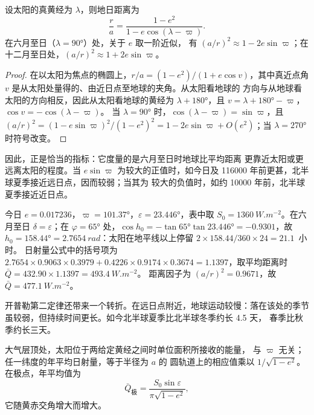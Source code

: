 \begin{proposition}[地日距离与太阳黄经]\label{prop:b2:orbital-forcing:distance}
设太阳的真黄经为 $\lambda$，则地日距离为
\[
  \frac{r}{a} = \frac{1 - e^2}{1 - e\cos(\lambda - \varpi)} .
\]
在六月至日（$\lambda = \ang{90}$）处，关于 $e$ 取一阶近似，
有 $(a/r)^2 \approx 1 - 2e\sin\varpi$；在十二月至日处，$(a/r)^2 \approx 1 + 2e\sin\varpi$。
\end{proposition}

\begin{proof}
在以太阳为焦点的椭圆上，$r/a = (1 - e^2)/(1 + e\cos v)$，其中真近点角 $v$
是从太阳处量得的、由近日点至地球的夹角。从太阳看地球的
方向与从地球看太阳的方向相反，因此从太阳看地球的黄经为
$\lambda + \ang{180}$，且 $v = \lambda + \ang{180} - \varpi$，$\cos v = -\cos(\lambda - \varpi)$。
当 $\lambda = \ang{90}$ 时，$\cos(\lambda - \varpi) = \sin\varpi$，且 $(a/r)^2 = (1 -
e\sin\varpi)^2/(1 - e^2)^2 = 1 - 2e\sin\varpi + O(e^2)$；当 $\lambda = \ang{270}$ 时符号改变。
\end{proof}

因此，正是恰当的指标：它度量的是六月至日时地球比平均距离
更靠近太阳或更远离太阳的程度。当 $e\sin\varpi$ 为较大的正值时，如今日及
\num{116000} 年前更甚，北半球夏季接近远日点，因而较弱；当其为
较大的负值时，如约 \num{10000} 年前，北半球夏季接近近日点。

\begin{example}\label{ex:b2:orbital-forcing:today}
今日 $e = 0.017236$，$\varpi = \ang{101.37}$，$\varepsilon = \ang{23.446}$，表中取
$S_0 = \qty{1360}{W.m^{-2}}$。在六月至日 $\delta = \varepsilon$；在 $\varphi =
\ang{65}$ 处，$\cos h_0 = -\tan\ang{65}\tan\ang{23.446} = -0.9301$，故 $h_0 = \ang{158.44} =
\qty{2.7654}{rad}$：太阳在地平线以上停留 $2 \times 158.44/360 \times 24 = 21.1$~小时。
日射量公式中的括号项为 $2.7654 \times 0.9063 \times 0.3979 + 0.4226 \times 0.9174 \times 0.3674 =
1.1397$，取平均距离时 $\bar Q = 432.90 \times 1.1397 = \qty{493.4}{W.m^{-2}}$。
距离因子为 $(a/r)^2 = 0.9671$，故 $\bar Q = \qty{477.1}{W.m^{-2}}$。
\end{example}

开普勒第二定律还带来一个转折。在远日点附近，地球运动较慢：落在该处的季节
虽较弱，但持续时间更长。如今北半球夏季比北半球冬季约长 4.5 天，
春季比秋季约长三天。

\begin{proposition}[年平均值与岁差无关]\label{prop:b2:orbital-forcing:annual}
大气层顶处，太阳位于两给定黄经之间时单位面积所接收的能量，
与 $\varpi$ 无关；任一纬度的年平均日射量，等于半径为 $a$ 的
圆轨道上的相应值乘以 $1/\sqrt{1 - e^2}$。在极点，年平均值为
\[
  \bar Q_{\text{极}} = \frac{S_0\sin\varepsilon}{\pi\sqrt{1 - e^2}} ,
\]
它随黄赤交角增大而增大。
\end{proposition}


